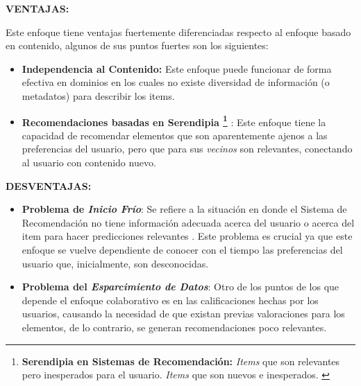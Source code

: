 \textbf{VENTAJAS:}


Este enfoque tiene ventajas fuertemente diferenciadas respecto al enfoque basado en contenido, algunos de sus puntos fuertes son los siguientes:

\begin{itemize}
    \item \textbf{Independencia al Contenido: } Este enfoque puede funcionar de forma efectiva en dominios en los cuales no existe diversidad de información (o metadatos) para describir los items.
    \item \textbf{Recomendaciones basadas en Serendipia \footnote{\textbf{Serendipia en Sistemas de Recomendación: } \textit{Items} que son relevantes pero inesperados para el usuario. \textit{Items} que son nuevos e inesperados. \parencite{Kotkov2020Serendipity}} }: Este enfoque tiene la capacidad de recomendar elementos que son aparentemente ajenos a las preferencias del usuario, pero que para sus \textit{vecinos} son relevantes, conectando al usuario con contenido nuevo.
\end{itemize}

\textbf{DESVENTAJAS:}

\begin{itemize}
    \item \textbf{Problema de \textit{Inicio Frío}}: Se refiere a la situación en donde el Sistema de Recomendación no tiene información adecuada acerca del usuario o acerca del item para hacer predicciones relevantes \parencite{Burke2007}. Este problema es crucial ya que este enfoque se vuelve dependiente de conocer con el tiempo las preferencias del usuario que, inicialmente, son desconocidas.

    \item \textbf{Problema del \textit{Esparcimiento de Datos}}: Otro de los puntos de los que depende el enfoque colaborativo es en las calificaciones hechas por los usuarios, causando la necesidad de que existan previas valoraciones para los elementos, de lo contrario, se generan recomendaciones poco relevantes.
\end{itemize}

